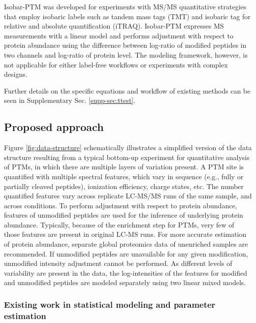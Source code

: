 \documentclass[mcp]{article}
\numberwithin{table}{section}
\begin{document}
Isobar-PTM was developed for experiments with MS/MS quantitative strategies that employ isobaric labels such as tandem mass tags (TMT) and isobaric tag for relative and absolute quantification (iTRAQ)\cite{Breitwieser:2013}. Isobar-PTM expresses MS measurements with a linear model and performs adjustment with respect to protein abundance using the difference between log-ratio of modified peptides in two channels and log-ratio of protein level. The modeling framework, however, is not applicable for either label-free workflows or experiments with complex designs. 

Further details on the specific equations and workflow of existing methods can be seen in Supplementary Sec. \ref{supp-sec:ttest}.

\subsection*{Proposed approach}

Figure \ref{fig:data-structure} schematically illustrates a simplified version of the data structure resulting from a typical bottom-up experiment for quantitative analysis of PTMs, in which there are multiple layers of variation present. A PTM site is quantified with multiple spectral features, which vary in sequence (e.g., fully or partially cleaved peptides), ionization efficiency, charge states, etc. The number quantified features vary across replicate LC-MS/MS runs of the same sample, and across conditions. To perform adjustment with respect to protein abundance, features of unmodified peptides are used for the inference of underlying protein abundance. Typically, because of the enrichment step for PTMs, very few of those features are present in original LC-MS runs. For more accurate estimation of protein abundance, separate global proteomics data of unenriched samples are recommended. If unmodified peptides are unavailable for any given modification, unmodified intensity adjustment cannot be performed. As different levels of variability are present in the data, the log-intensities of the features for modified and unmodified peptides are modeled separately using two linear mixed models.

\subsubsection*{Existing work in statistical modeling and parameter estimation}
\end{document}
